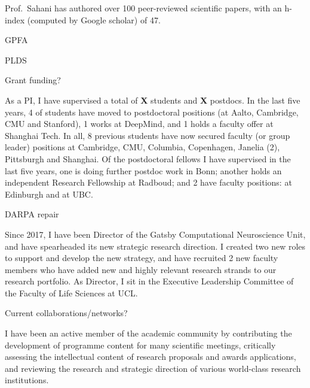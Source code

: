 Prof.\ Sahani has authored over 100 peer-reviewed scientific papers,
with an h-index (computed by Google scholar) of 47.

GPFA

PLDS

Grant funding?


As a PI, I have supervised a total of \textbf{X} students and \textbf{X} postdocs.  
In the last five years, 4 of students have moved to postdoctoral positions (at
Aalto, Cambridge, CMU and Stanford), 1 works at DeepMind, and 1 holds a faculty offer at Shanghai Tech.  In all, 8 previous students have now secured faculty (or group leader) positions at Cambridge, CMU, Columbia, Copenhagen, Janelia (2), Pittsburgh and Shanghai.
%
Of the postdoctoral fellows I have supervised in the last five years, one is doing further postdoc work in Bonn; another holds an independent
Research Fellowship at Radboud; and 2 have faculty positions: at Edinburgh and at UBC.

DARPA repair

Since 2017, I have been Director of the Gatsby Computational Neuroscience Unit, and have spearheaded its new strategic research direction. I created two new roles to support and develop the new strategy, and have recruited 2 new faculty members who have added new and highly relevant research strands to our research portfolio. As Director, I sit in the Executive Leadership Committee of the Faculty of Life Sciences at UCL. 
 


% 

Current collaborations/networks?

I have been an active member of the academic community by contributing the development of programme content for many scientific meetings, critically assessing the intellectual content of research proposals and awards applications, and reviewing the research and strategic direction of various world-class research institutions. 

